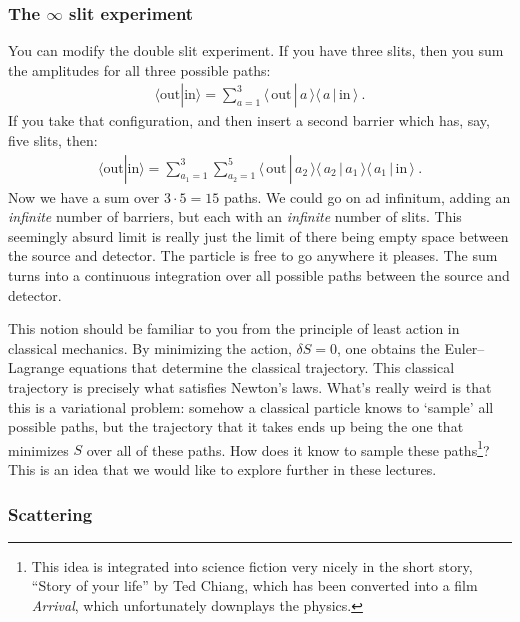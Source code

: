 \documentclass[12pt]{article}
\numberwithin{equation}{section}    %
\theoremstyle{definition}
\begin{document}
\subsubsection{The $\infty$ slit experiment}

You can modify the double slit experiment. If you have three slits, then you sum the amplitudes for all three possible paths:
\begin{align}
	\langle \text{out} | \text{in}\rangle
	 = 
	\sum_{a=1}^{3}
	\langle \,\text{out}\, |  \, a \,\rangle
		\langle \, a\, |  \,\text{in} \,\rangle \ .
\end{align}
If you take that configuration, and then insert a second barrier which has, say, five slits, then:
\begin{align}
	\langle \text{out} | \text{in}\rangle
	 = 
	\sum_{a_1 = 1}^{3}
	\sum_{a_2 = 1}^{5}
	\langle \,\text{out}\, |  \, a_2 \,\rangle
	\langle \, a_2\, | \, a_1 \,\rangle
		\langle \, a_1\, |  \,\text{in} \,\rangle \ .
\end{align}
Now we have a sum over $3\cdot 5 = 15$ paths. We could go on ad infinitum, adding an \emph{infinite} number of barriers, but each with an \emph{infinite} number of slits. This seemingly absurd limit is really just the limit of there being empty space between the source and detector. The particle is free to go anywhere it pleases. The sum turns into a continuous integration over all possible paths between the source and detector.

This notion should be familiar to you from the principle of least action in classical mechanics. By minimizing the action, $\delta S = 0$, one obtains the Euler--Lagrange equations that determine the classical trajectory. This classical trajectory is precisely what satisfies Newton's laws. What's really weird is that this is a variational problem: somehow a classical particle knows to `sample' all possible paths, but the trajectory that it takes ends up being the one that minimizes $S$ over all of these paths. How does it know to sample these paths\footnote{This idea is integrated into science fiction very nicely in the short story, ``Story of your life'' by Ted Chiang, which has been converted into a film \emph{Arrival}, which unfortunately downplays the physics.}? This is an idea that we would like to explore further in these lectures. 




\subsubsection{Scattering}
\end{document}
